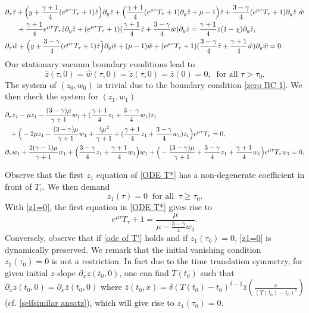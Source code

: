 \documentclass{article}
\newcommand{\ga}{\gamma}
\newcommand{\pa}{\partial}
\def\be{\begin{equation}}
\def\ee{\end{equation}}
\numberwithin{equation}{section}
\begin{document}
\begin{align}
		&\partial_\tau \tilde z + \Big(y+\frac{\ga+1}{4}(e^{\mu \tau}T_\tau+1)\mathring z \Big) \partial_y \tilde z + \Big(\frac{\ga+1}{4}(e^{\mu \tau}T_\tau+1)\partial_y \mathring z +\mu-1\Big)\tilde z +\frac{3-\ga}{4}(e^{\mu \tau}T_\tau+1)\partial_y\mathring z \ \tilde w \notag \\ 
        &\quad \ \  + \frac{\ga+1}{4}e^{\mu \tau}T_\tau \mathring z\pa_y \mathring z+(e^{\mu \tau}T_\tau+1)(\frac{\ga+1}{4}\tilde z+\frac{3-\ga}{4}\tilde w)\partial_y \tilde z=\frac{\ga+1}{4} \bar z (1-\chi) \pa_y \mathring z , \label{PDE of tilde z w with T*}\\
		&\partial_\tau \tilde w + \Big(y+\frac{3-\ga}{4}(e^{\mu \tau}T_\tau+1)\mathring z \Big) \partial_y \tilde w + (\mu-1)\tilde w +(e^{\mu \tau}T_\tau+1)(\frac{3-\ga}{4}\tilde z+\frac{\ga+1}{4}\tilde w)\partial_y \tilde w= 0.\notag  
\end{align}
Our stationary vacuum boundary conditions lead to 
\be\label{zero BC 1}
    \hat z(\tau,0) = \hat w(\tau,0) = \tilde z(\tau, 0) =\bar z(0)=0,\ \text{ for all }\tau>\tau_0.
\ee
The system of $(z_0,w_0)$ is trivial due to the boundary condition \eqref{zero BC 1}. %
We then check the system for $(z_1,w_1)$
\begin{align}
		&\partial_\tau z_1 -\mu z_1  -\frac{(3-\ga)\mu}{\ga+1}w_1  +(\frac{\ga+1}{4}z_1 +\frac{3-\ga}{4}w_1 )z_1 \notag  \\ 
        &\ \ +\Big(-2\mu z_1 -\frac{(3-\ga)\mu}{\ga+1}w_1+ \frac{4\mu^2}{\ga+1}+(\frac{\ga+1}{4}z_1 +\frac{3-\ga}{4}w_1 )z_1\Big)e^{\mu \tau}T_\tau = 0, \label{ODE T*}\\
		&\partial_\tau w_1  +\frac{2(\ga-1)\mu}{\ga+1} w_1  +\Big(\frac{3-\ga}{4}z_1+\frac{\ga+1}{4}w_1 \Big)w_1+\Big(-\frac{(3-\ga)\mu}{\ga+1}+\frac{3-\ga}{4}z_1+\frac{\ga+1}{4}w_1\Big)e^{\mu \tau}T_\tau w_1 = 0. \notag 
\end{align}

Observe that the first $z_1$ equation of \eqref{ODE T*} has a non-degenerate coefficient in front of $T_\tau$. We then demand 
\be\label{z1=0}
z_1 (\tau)=0  \ \text{ for all } \ \tau\ge \tau_0. 
\ee
    With \eqref{z1=0}, the first equation in \eqref{ODE T*} gives rise to 
\be\label{ode of T'}
	e^{\mu \tau}T_\tau+1 %
    = \frac{\mu}{\mu-\frac{3-\ga}{4}w_1}.
\ee
Conversely, observe that  if \eqref{ode of T'} holds and if $z_1(\tau_0)=0$, \eqref{z1=0} is dynamically preserved. We remark that the initial vanishing condition $z_1(\tau_0)=0$ is not a restriction. In fact due to the time translation symmetry, for given initial $z$-slope $\pa_x z (t_0,0)$, one can find $T(t_0)$ such that $\pa_x z (t_0,0) = \pa_x \bar z (t_0, 0)$ where $\bar z (t_0,x) = \delta (T(t_0)-t_0)^{\delta-1} \bar z (\frac{x}{ (T(t_0)-t_0)^{\delta} })$ (cf. \eqref{selfsimilar ansatz}), which will give rise to $z_1(\tau_0)=0$. 
\end{document}
